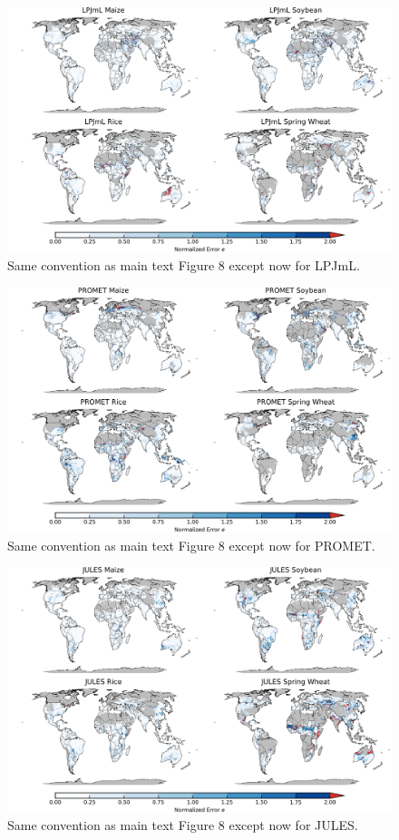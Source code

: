 \documentclass[10pt]{article}
\begin{document}
\begin{figure}[h!]
\centering
\includegraphics[width=15.5cm]{LPJmL_spatial_error.png}
\caption{Same convention as main text Figure 8 except now for LPJmL.}
\label{fig:lpjmlnorm}
\end{figure}

\begin{figure}[h!]
\centering
\includegraphics[width=15.5cm]{PROMET_spatial_error.png}
\caption{Same convention as main text Figure 8 except now for PROMET.}
\label{fig:lpjmlnorm}
\end{figure}

\begin{figure}[h!]
\centering
\includegraphics[width=15.5cm]{JULES_spatial_error.png}
\caption{Same convention as main text Figure 8 except now for JULES.}
\label{fig:lpjmlnorm}
\end{figure}
\end{document}
